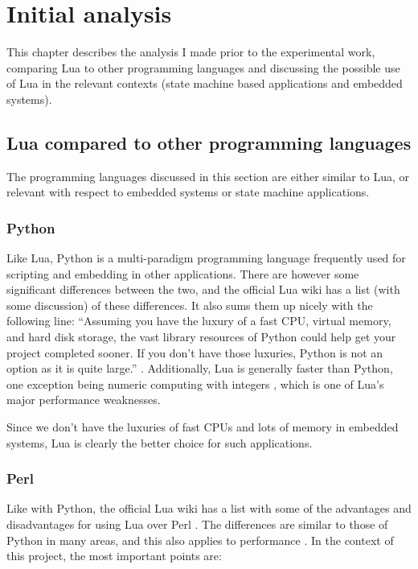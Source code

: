 \chapter{Initial analysis}
\label{ch:initial_analysis}
This chapter describes the analysis I made prior to the experimental work, comparing Lua to other programming languages and discussing the possible use of Lua in the relevant contexts (state machine based applications and embedded systems).


\section{Lua compared to other programming languages}
\label{sec:lua_compared}
The programming languages discussed in this section are either similar to Lua, or relevant with respect to embedded systems or state machine applications.

\subsection{Python}
\label{sec:lua_vs_python}
Like Lua, Python is a multi-paradigm programming language frequently used for scripting and embedding in other applications. There are however some significant differences between the two, and the official Lua wiki has a list (with some discussion) of these differences. It also sums them up nicely with the following line: ``Assuming you have the luxury of a fast CPU, virtual memory, and hard disk storage, the vast library resources of Python could help get your project completed sooner. If you don't have those luxuries, Python is not an option as it is quite large.'' \cite{website:lua_wiki_python}. Additionally, Lua is generally faster than Python, one exception being numeric computing with integers \cite{website:lua_perl_python_vs}, which is one of Lua's major performance weaknesses.

Since we don’t have the luxuries of fast CPUs and lots of memory in embedded systems, Lua is clearly the better choice for such applications.

\subsection{Perl}
\label{sec:lua_vs_perl}
Like with Python, the official Lua wiki has a list with some of the advantages and disadvantages for using Lua over Perl \cite{website:lua_wiki_perl}. The differences are similar to those of Python in many areas, and this also applies to performance \cite{website:lua_perl_python_vs}. In the context of this project, the most important points are:

